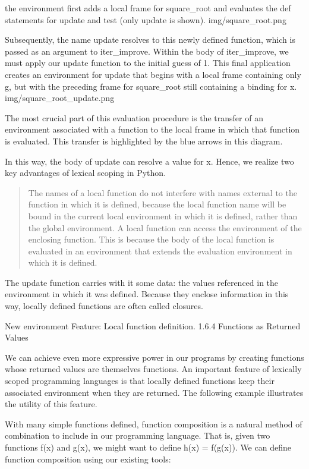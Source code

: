 \documentclass[letterpaper,10pt,dvipdfmx]{sphinxmanual}
\begin{document}
the environment first adds a local frame for square\_root and evaluates the def statements for update and test (only update is shown).
img/square\_root.png

Subsequently, the name update resolves to this newly defined function, which is passed as an argument to iter\_improve. Within the body of iter\_improve, we must apply our update function to the initial guess of 1. This final application creates an environment for update that begins with a local frame containing only g, but with the preceding frame for square\_root still containing a binding for x.
img/square\_root\_update.png

The most crucial part of this evaluation procedure is the transfer of an environment associated with a function to the local frame in which that function is evaluated. This transfer is highlighted by the blue arrows in this diagram.

In this way, the body of update can resolve a value for x. Hence, we realize two key advantages of lexical scoping in Python.
\begin{quote}

The names of a local function do not interfere with names external to the function in which it is defined, because the local function name will be bound in the current local environment in which it is defined, rather than the global environment.
A local function can access the environment of the enclosing function. This is because the body of the local function is evaluated in an environment that extends the evaluation environment in which it is defined.
\end{quote}

The update function carries with it some data: the values referenced in the environment in which it was defined. Because they enclose information in this way, locally defined functions are often called closures.

New environment Feature: Local function definition.
1.6.4   Functions as Returned Values

We can achieve even more expressive power in our programs by creating functions whose returned values are themselves functions. An important feature of lexically scoped programming languages is that locally defined functions keep their associated environment when they are returned. The following example illustrates the utility of this feature.

With many simple functions defined, function composition is a natural method of combination to include in our programming language. That is, given two functions f(x) and g(x), we might want to define h(x) = f(g(x)). We can define function composition using our existing tools:
\end{document}
